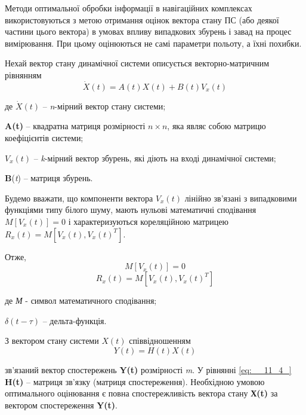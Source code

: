 
 Методи оптимальної обробки інформації в навігаційних комплексах використовуються  
з метою отримання оцінок вектора стану ПС (або деякої частини цього вектора) в умовах 
впливу випадкових збурень і завад на процес вимірювання. При цьому оцінюються не 
самі параметри польоту, а  їхні похибки.

Нехай вектор стану динамічної системи описується векторно-матричним рівнянням                            
\begin{equation}
\label{eq:__11_3_}
\dot{X}(t)=A(t)X(t)+B(t)V_{x}(t)
\end{equation}
\begin{ESKDexplanation}                
\item де $\dot{X}\left(t\right)$ -- \textit{n}-мірний вектор стану системи; 
\item \textbf{A(t)} -- квадратна матриця розмірності $n\times n$, яка являє собою матрицю коефіцієнтів 
системи; 
\item $V_{x} \left(t\right)$ -- \textit{k}-мірний вектор збурень, які діють 
на вході динамічної системи; 
\item \textbf{B}(\textit{t}) -- матриця збурень.
\end{ESKDexplanation}
Будемо вважати, що компоненти вектора $V_{x} \left(t\right)$ лінійно зв'язані з випадковими 
функціями типу білого шуму, мають нульові математичні сподівання  $M[V_{x}(t)]=0$ 
і характеризуються кореляційною матрицею $R_{x} \left(t\right) = M[V_{x}(t),V_{x}(t)^{T}]$. 

Отже,
\[M[V_{x}(t)]=0 \] 
\[R_{x} \left(t\right) = M[V_{x}(t),V_{x}(t)^{T}] \]
\begin{ESKDexplanation}
 \item де \textit{М} - символ математичного сподівання; 
 \item $\delta (t -\tau)$ -- дельта-функція.
\end{ESKDexplanation}

З  вектором стану системи $X(t)$ співвідношенням
\begin{equation} 
\label{eq:__11_4_} Y(t)=H(t)X(t) 
\end{equation} 

зв'язаний вектор спостережень \textbf{Y(t)} розмірності \textit{m}.
У рівнянні \eqref{eq:__11_4_} \textbf{H(t)} -- матриця зв'язку (матриця 
спостереження). Необхідною умовою оптимального оцінювання є повна спостережливість 
вектора стану \textbf{Х(t)} за вектором спостереження \textbf{Y(t)}.

